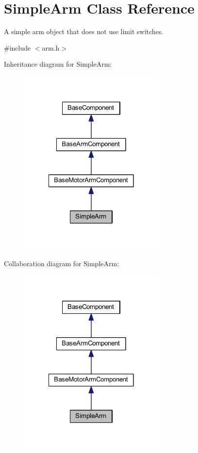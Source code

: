 \hypertarget{class_simple_arm}{\section{\-Simple\-Arm \-Class \-Reference}
\label{class_simple_arm}
}


\-A simple arm object that does not use limit switches.  




{\ttfamily \#include $<$arm.\-h$>$}



\-Inheritance diagram for \-Simple\-Arm\-:\nopagebreak
\begin{figure}[H]
\begin{center}
\leavevmode
\includegraphics[width=210pt]{class_simple_arm__inherit__graph}
\end{center}
\end{figure}


\-Collaboration diagram for \-Simple\-Arm\-:\nopagebreak
\begin{figure}[H]
\begin{center}
\leavevmode
\includegraphics[width=210pt]{class_simple_arm__coll__graph}
\end{center}
\end{figure}
